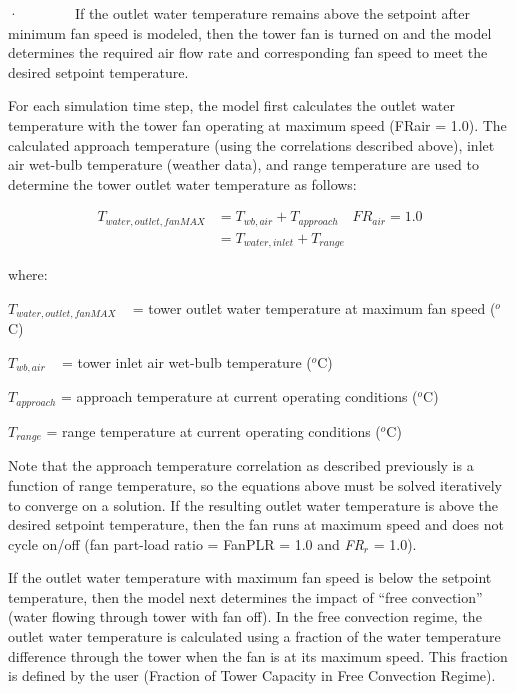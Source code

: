 ·~~~~~~~~If the outlet water temperature remains above the setpoint after minimum fan speed is modeled, then the tower fan is turned on and the model determines the required air flow rate and corresponding fan speed to meet the desired setpoint temperature.

For each simulation time step, the model first calculates the outlet water temperature with the tower fan operating at maximum speed (FRair = 1.0). The calculated approach temperature (using the correlations described above), inlet air wet-bulb temperature (weather data), and range temperature are used to determine the tower outlet water temperature as follows:

\begin{equation}
  \begin{array}{rl}
    T_{water,outlet,fanMAX} &= T_{wb,air} + T_{approach} \quad FR_{air} = 1.0 \\
                              &= {T_{water,inlet}} + {T_{range}}
  \end{array}
\end{equation}

where:

\({T_{water,outlet,fanMAX}}\) ~ = tower outlet water temperature at maximum fan speed (\(^{o}\)C)

\({T_{wb,air}}\) ~ = tower inlet air wet-bulb temperature (\(^{o}\)C)

\({T_{approach}}\) = approach temperature at current operating conditions (\(^{o}\)C)

\({T_{range}}\) = range temperature at current operating conditions (\(^{o}\)C)

Note that the approach temperature correlation as described previously is a function of range temperature, so the equations above must be solved iteratively to converge on a solution. If the resulting outlet water temperature is above the desired setpoint temperature, then the fan runs at maximum speed and does not cycle on/off (fan part-load ratio = FanPLR = 1.0 and \emph{FR\(_{r}\)} = 1.0).

If the outlet water temperature with maximum fan speed is below the setpoint temperature, then the model next determines the impact of ``free convection'' (water flowing through tower with fan off). In the free convection regime, the outlet water temperature is calculated using a fraction of the water temperature difference through the tower when the fan is at its maximum speed. This fraction is defined by the user (Fraction of Tower Capacity in Free Convection Regime).


